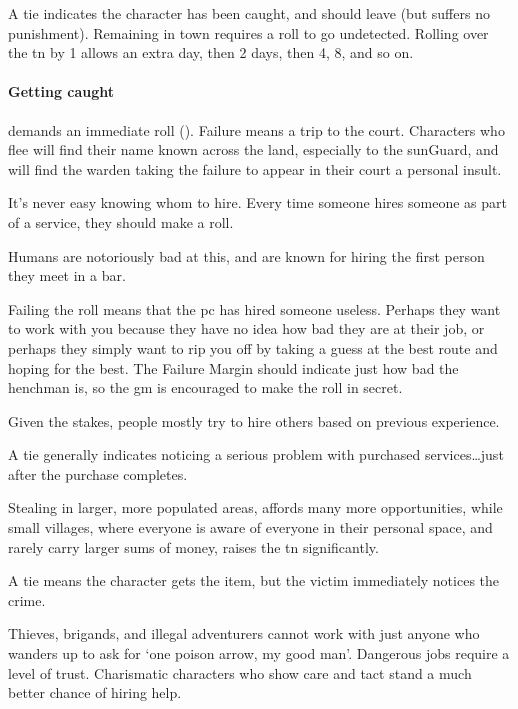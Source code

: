 \begin{multicols}{2}
A tie indicates the character has been caught, and should leave (but suffers no punishment).
Remaining in town requires a  roll to go undetected.
Rolling over the \gls{tn} by 1 allows an extra day, then 2 days, then 4, 8, and so on.

\paragraph{Getting caught}
demands an immediate  roll (\tn[10]).
Failure means a trip to the \gls{court}.
Characters who flee will find their name known across the land, especially to the \gls{sunGuard}, and will find the \gls{warden} taking the failure to appear in their \gls{court} a personal insult.

It's never easy knowing whom to hire.
Every time someone hires someone as part of a service, they should make a roll.

Humans are notoriously bad at this, and are known for hiring the first person they meet in a bar.

Failing the roll means that the \gls{pc} has hired someone useless.
Perhaps they want to work with you because they have no idea how bad they are at their job, or perhaps they simply want to rip you off by taking a guess at the best route and hoping for the best.
The Failure Margin should indicate just how bad the henchman is, so the \gls{gm} is encouraged to make the roll in secret.

Given the stakes, people mostly try to hire others based on previous experience.

A tie generally indicates noticing a serious problem with purchased services\ldots just after the purchase completes.

Stealing in larger, more populated areas, affords many more opportunities, while small \glspl{village}, where everyone is aware of everyone in their personal space, and rarely carry larger sums of money, raises the \gls{tn} significantly.


A tie means the character gets the item, but the victim immediately notices the crime.

\larcenyChart

Thieves, brigands, and illegal adventurers cannot work with just anyone who wanders up to ask for `one poison arrow, my good man'.
Dangerous jobs require a level of trust.
Charismatic characters who show care and tact stand a much better chance of hiring help.


\end{multicols}
